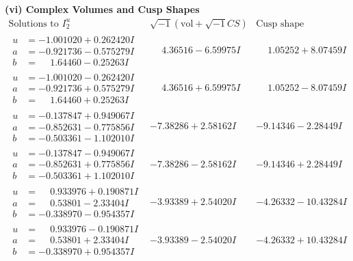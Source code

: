 \documentclass[1p]{elsarticle_modified}
\theoremstyle{definition}
\newcommand{\I}{\sqrt{-1}}
\begin{document}
\newpage\flushleft \textbf{(vi) Complex Volumes and Cusp Shapes}
$$\begin{array}{c|c|c}  
\text{Solutions to }I^u_{2}& \I (\text{vol} + \sqrt{-1}CS) & \text{Cusp shape}\\
 \hline 
\begin{aligned}
u &= -1.001020 + 0.262420 I \\
a &= -0.921736 - 0.575279 I \\
b &= \phantom{-}1.64460 - 0.25263 I\end{aligned}
 & \phantom{-}4.36516 - 6.59975 I & \phantom{-}1.05252 + 8.07459 I \\ \hline\begin{aligned}
u &= -1.001020 - 0.262420 I \\
a &= -0.921736 + 0.575279 I \\
b &= \phantom{-}1.64460 + 0.25263 I\end{aligned}
 & \phantom{-}4.36516 + 6.59975 I & \phantom{-}1.05252 - 8.07459 I \\ \hline\begin{aligned}
u &= -0.137847 + 0.949067 I \\
a &= -0.852631 - 0.775856 I \\
b &= -0.503361 - 1.102010 I\end{aligned}
 & -7.38286 + 2.58162 I & -9.14346 - 2.28449 I \\ \hline\begin{aligned}
u &= -0.137847 - 0.949067 I \\
a &= -0.852631 + 0.775856 I \\
b &= -0.503361 + 1.102010 I\end{aligned}
 & -7.38286 - 2.58162 I & -9.14346 + 2.28449 I \\ \hline\begin{aligned}
u &= \phantom{-}0.933976 + 0.190871 I \\
a &= \phantom{-}0.53801 - 2.33404 I \\
b &= -0.338970 - 0.954357 I\end{aligned}
 & -3.93389 + 2.54020 I & -4.26332 - 10.43284 I \\ \hline\begin{aligned}
u &= \phantom{-}0.933976 - 0.190871 I \\
a &= \phantom{-}0.53801 + 2.33404 I \\
b &= -0.338970 + 0.954357 I\end{aligned}
 & -3.93389 - 2.54020 I & -4.26332 + 10.43284 I \\ \hline\begin{aligned}

\end{aligned}
\end{array}$$
\end{document}
